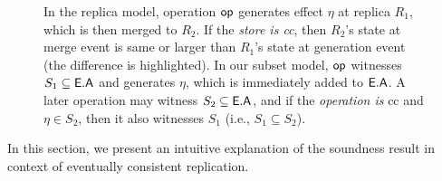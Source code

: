 \begin{figure}
{}
\hspace*{0.1in}
 \caption{In the replica model, operation $\textsf{op}$ generates effect
$\eta$ at replica $R_1$, which is then merged to $R_2$. If the
\emph{store is {\sc cc}}, then $R_2$'s state at merge event is same or
larger than $R_1$'s state at generation event (the difference is
highlighted). In our subset model, $\textsf{op}$ witnesses $S_1 \subseteq
\textsf{E}.\textsf{A}$ and generates $\eta$, which is immediately added to $\textsf{E}.\textsf{A}$. A
later operation may witness $S_2 \subseteq \textsf{E}.\textsf{A}$, and if the
\emph{operation is} {\sc cc} and $\eta \in S_2$, then it also
witnesses $S_1$ (i.e., $S_1 \subseteq S_2$). } 
\label{fig:ec-theirs-vs-ours}
\end{figure}

In this section, we present an intuitive explanation of the soundness
result in context of eventually consistent replication. 

